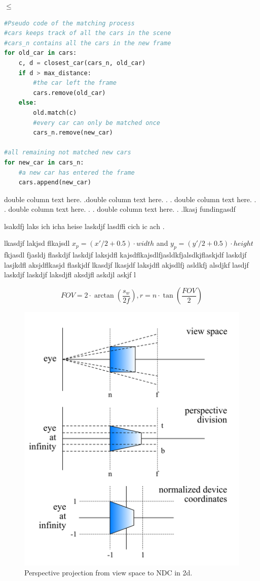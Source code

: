 \documentclass[conference]{IEEEtran}
\begin{document}
$\leq$

\begin{lstlisting}[language=Python, basicstyle=\small, tabsize=4]
#Pseudo code of the matching process
#cars keeps track of all the cars in the scene
#cars_n contains all the cars in the new frame
for old_car in cars:
    c, d = closest_car(cars_n, old_car)
	if d > max_distance:
        #the car left the frame
	    cars.remove(old_car)
	else:
        old.match(c)
        #every car can only be matched once
        cars_n.remove(new_car)

#all remaining not matched new cars
for new_car in cars_n: 
    #a new car has entered the frame 
    cars.append(new_car) 
\end{lstlisting}


\begin{multicols}{2}

    double column text here. .double column text here. . .
    double column text here. . .
    double column text here. . .
    double column text here. . .lkasj fundingasdf

    lsakdfj laks ich icha heise laskdjf lasdffi cich ic ach
    .

\end{multicols}
lkasdjf lakjsd flkajsdl $x_p = ({x'}/{2} + 0.5) \cdot width$ and $y_p = ({y'}/{2} + 0.5) \cdot height$ fkjasdl fjasldj flaskdjf laskdjf laksjdfl kajsdflkajsdlfjasldkfjalsdkjflaskjdf laskdjf lasjkdfl aksjdflkasjd flaskjdf lkasdjf lkasjdf laksjdfl akjsdlfj asldkfj alsdjkf lasdjf laskdjf laskdjf laksdjfl aksdjfl askdjl askjf l

\begin{equation}
    FOV = 2 \cdot \arctan\left(\frac{s_w}{2f}\right),
    r = n \cdot \tan\left(\frac{FOV}{2}\right)
\end{equation}

\begin{figure}
    \centering
    \includegraphics[width=0.8\columnwidth]{./images/view_coordinates_to_ndc.png}
    \caption{Perspective projection from view space to NDC in 2d.}
    \label{img:view_to_ndc}
\end{figure}
\end{document}
